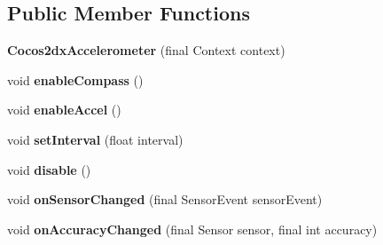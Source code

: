 \subsection*{Public Member Functions}
\begin{DoxyCompactItemize}
\item 
\mbox{\label{classorg_1_1cocos2dx_1_1lib_1_1Cocos2dxAccelerometer_a147a3bac88f86625c309b38ddfe7f54a}} 
{\bfseries Cocos2dx\+Accelerometer} (final Context context)
\item 
\mbox{\label{classorg_1_1cocos2dx_1_1lib_1_1Cocos2dxAccelerometer_a15d9d5839b1732b00a370d2e6ea8df85}} 
void {\bfseries enable\+Compass} ()
\item 
\mbox{\label{classorg_1_1cocos2dx_1_1lib_1_1Cocos2dxAccelerometer_aeb8845518cbb246238d4dda5e39a6e54}} 
void {\bfseries enable\+Accel} ()
\item 
\mbox{\label{classorg_1_1cocos2dx_1_1lib_1_1Cocos2dxAccelerometer_ae68e3f14ee6bae620c7068520c5c9453}} 
void {\bfseries set\+Interval} (float interval)
\item 
\mbox{\label{classorg_1_1cocos2dx_1_1lib_1_1Cocos2dxAccelerometer_a07d871f22a98e6081351269b53bdc93b}} 
void {\bfseries disable} ()
\item 
\mbox{\label{classorg_1_1cocos2dx_1_1lib_1_1Cocos2dxAccelerometer_a2609e24f0feaf7087a8aca9745082132}} 
void {\bfseries on\+Sensor\+Changed} (final Sensor\+Event sensor\+Event)
\item 
\mbox{\label{classorg_1_1cocos2dx_1_1lib_1_1Cocos2dxAccelerometer_afd435fe99c31dc1e7e0bb75ec7ccf5d0}} 
void {\bfseries on\+Accuracy\+Changed} (final Sensor sensor, final int accuracy)
\item 
\mbox{\label{classorg_1_1cocos2dx_1_1lib_1_1Cocos2dxAccelerometer_a147a3bac88f86625c309b38ddfe7f54a}} 

\end{DoxyCompactItemize}
